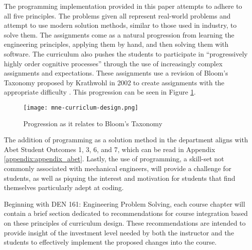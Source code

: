 The programming implementation provided in this paper attempts to adhere to all five
principles. The problems given all represent real-world problems and attempt to use
modern solution methods, similar to those used in industry, to solve them. The assignments
come as a natural progression from learning the engineering principles, applying them by
hand, and then solving them with software. The curriculum also pushes the students to 
participate in ``progressively highly order cognitive processes'' through the use of 
increasingly complex assignments and expectations. These assignments use a revision of
Bloom's Taxonomy proposed by Krathwohl in 2002 to create assignments with the appropriate
difficulty \cite{revised-bloom}. This progression can be seen in Figure \ref{revised-bloom-taxonomy}.

\begin{figure}
    \texttt{[image: mne-curriclum-design.png]}
    \caption{Progression as it relates to Bloom's Taxonomy}
    \label{revised-bloom-taxonomy}
\end{figure}

The addition of programming as a solution method in the department aligns with Abet 
Student Outcomes 1, 3, 6, and 7, which can be read in Appendix \ref{appendix:appendix_abet}.
Lastly, the use of programming, a skill-set not commonly associated with mechanical
engineers, will provide a challenge for students, as well as piquing the interest and 
motivation for students that find themselves particularly adept at coding.

Beginning with DEN 161: Engineering Problem Solving, each course chapter will contain
a brief section dedicated to recommendations for course integration based on these
principles of curriculum design. These recommendations are intended to provide insight
of the investment level needed by both the instructor and the students to effectively 
implement the proposed changes into the course.